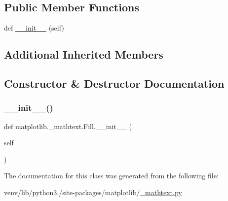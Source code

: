 \subsection*{Public Member Functions}
\begin{DoxyCompactItemize}
\item 
def \hyperlink{classmatplotlib_1_1__mathtext_1_1Fill_acb2b18248eb3bebc3e0f407737132ca5}{\+\_\+\+\_\+init\+\_\+\+\_\+} (self)
\end{DoxyCompactItemize}
\subsection*{Additional Inherited Members}


\subsection{Constructor \& Destructor Documentation}
\mbox{\label{classmatplotlib_1_1__mathtext_1_1Fill_acb2b18248eb3bebc3e0f407737132ca5}} 
\subsubsection{\texorpdfstring{\+\_\+\+\_\+init\+\_\+\+\_\+()}{\_\_init\_\_()}}
{\footnotesize\ttfamily def matplotlib.\+\_\+mathtext.\+Fill.\+\_\+\+\_\+init\+\_\+\+\_\+ (\begin{DoxyParamCaption}\item[{}]{self }\end{DoxyParamCaption})}



The documentation for this class was generated from the following file\+:\begin{DoxyCompactItemize}
\item 
venv/lib/python3./site-\/packages/matplotlib/\hyperlink{__mathtext_8py}{\+\_\+mathtext.\+py}\end{DoxyCompactItemize}
